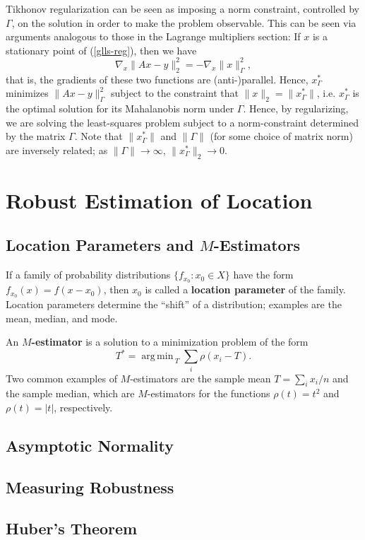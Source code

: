 \documentclass[reqno]{amsart}
\DeclareMathOperator*{\argmin}{arg\,min\,}
\numberwithin{equation}{section}
\begin{document}
Tikhonov regularization can be seen as imposing a norm constraint, controlled by $\Gamma$, on
the solution in order to make the problem observable. This can be seen via arguments analogous
to those in the Lagrange multipliers section: If $x$ is a stationary point of
(\ref{glls-reg}), then we have
$$
    \nabla_x \| Ax - y \|_2^2 = -\nabla_x \| x \|_{\Gamma}^2,
$$
that is, the gradients of these two functions are (anti-)parallel. Hence, $x^*_{\Gamma}$ minimizes
$\|Ax - y\|_{\Gamma}^2$ subject to the constraint that $\| x \|_2 = \|x^*_{\Gamma}\|$, i.e.
$x^*_{\Gamma}$ is the optimal solution for its Mahalanobis norm under $\Gamma$. Hence, by
regularizing, we are solving the least-squares problem subject to a norm-constraint determined
by the matrix $\Gamma$. Note that $\|x^*_{\Gamma}\|$
and $\|\Gamma\|$ (for some choice of matrix norm) are inversely related; as
$\|\Gamma\| \to \infty$, $\|x^*_\Gamma\|_2 \to 0$.

\section {Robust Estimation of Location}
\subsection{Location Parameters and $M$-Estimators}
If a family of probability distributions $\{ f_{x_0} : x_0 \in X\}$ have the form
$f_{x_0}(x) = f(x - x_0)$, then $x_0$ is called a \textbf{location parameter} of the family. Location parameters
determine the ``shift'' of a distribution; examples are the mean, median, and mode.

An \textbf{$M$-estimator} is a solution to a minimization problem of the form
$$
    T^* = \argmin_{T} \sum_i \rho(x_i - T).
$$
Two common examples of $M$-estimators are the sample mean $T = \sum_i x_i /n$ and the sample median, which
are $M$-estimators for the functions $\rho(t) = t^2$ and $\rho(t) = |t|$, respectively.

\subsection{Asymptotic Normality}
\subsection{Measuring Robustness}
\subsection{Huber's Theorem}
\end{document}
